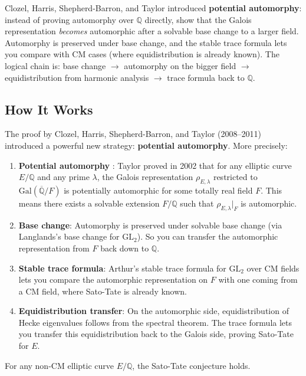 Clozel, Harris, Shepherd-Barron, and Taylor introduced \textbf{potential automorphy}: instead of proving automorphy over $\mathbb{Q}$ directly, show that the Galois representation \emph{becomes} automorphic after a solvable base change to a larger field. Automorphy is preserved under base change, and the stable trace formula lets you compare with CM cases (where equidistribution is already known). The logical chain is: base change $\to$ automorphy on the bigger field $\to$ equidistribution from harmonic analysis $\to$ trace formula back to $\mathbb{Q}$.

\subsection{How It Works}

The proof by Clozel, Harris, Shepherd-Barron, and Taylor (2008--2011) introduced a powerful new strategy: \textbf{potential automorphy}. More precisely:

\begin{enumerate}
\item \textbf{Potential automorphy} \cite{taylor2002}: Taylor proved in 2002 that for any elliptic curve $E/\mathbb{Q}$ and any prime $\lambda$, the Galois representation $\rho_{E,\lambda}$ restricted to $\text{Gal}(\overline{\mathbb{Q}}/F)$ is potentially automorphic for some totally real field $F$. This means there exists a solvable extension $F/\mathbb{Q}$ such that $\rho_{E,\lambda}|_F$ is automorphic.
\item \textbf{Base change}: Automorphy is preserved under solvable base change (via Langlands's base change for $\text{GL}_2$). So you can transfer the automorphic representation from $F$ back down to $\mathbb{Q}$.
\item \textbf{Stable trace formula}: Arthur's stable trace formula for $\text{GL}_2$ over CM fields lets you compare the automorphic representation on $F$ with one coming from a CM field, where Sato-Tate is already known.
\item \textbf{Equidistribution transfer}: On the automorphic side, equidistribution of Hecke eigenvalues follows from the spectral theorem. The trace formula lets you transfer this equidistribution back to the Galois side, proving Sato-Tate for $E$.
\end{enumerate}

\begin{theorem}
For any non-CM elliptic curve $E/\mathbb{Q}$, the Sato-Tate conjecture holds.
\end{theorem}

